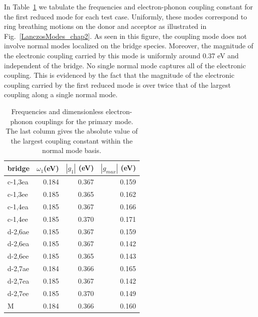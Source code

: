 In Table~\ref{table2} we tabulate the frequencies and electron-phonon coupling constant for the first reduced mode for each
test case.  Uniformly, these modes correspond to ring breathing motions on the donor and acceptor as illustrated in Fig.~\ref{LanczosModes_chap2}.
As seen in this figure, the coupling mode does not involve normal modes localized on the bridge species.
Moreover, the magnitude of the electronic coupling carried by this mode is uniformly around 0.37 eV  and independent of the bridge.
No single normal mode captures all of the electronic coupling.  This is evidenced by the fact that the magnitude of the electronic coupling
carried by the first reduced mode is over twice that of the largest coupling along a single normal mode.



\begin{table}[t]
\centering
\begin{tabular}{lrrr}
 bridge   &  $\omega_1$(eV)  & $|g_{1}|$ (eV)  &  $|g_{max}|$ (eV)  \\
\hline
\hline
 c-1,3ea  &           0.184  &         0.367  &           0.159  \\
 c-1,3ee  &           0.185  &         0.365  &           0.162  \\
 c-1,4ea  &           0.185  &         0.367  &           0.166  \\
 c-1,4ee  &           0.185  &         0.370  &           0.171  \\
 d-2,6ae  &           0.185  &         0.367  &           0.159  \\
 d-2,6ea  &           0.185  &         0.367  &           0.142  \\
 d-2,6ee  &           0.185  &         0.365  &           0.143  \\
 d-2,7ae  &           0.184  &         0.366  &           0.165  \\
 d-2,7ea  &           0.185  &         0.367  &           0.142  \\
 d-2,7ee  &           0.185  &         0.370  &           0.149  \\
 M           &           0.184  &         0.366  &           0.160  \\
 \hline
\end{tabular}
\caption{Frequencies and dimensionless electron-phonon couplings for
the primary mode. The last column gives the
absolute value of the largest coupling constant within the normal mode basis.
}\label{table2}

\end{table}


